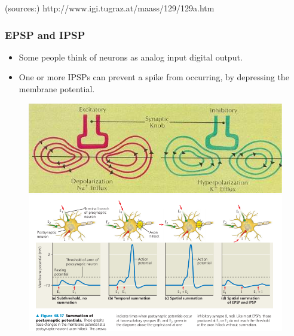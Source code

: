 \documentclass{beamer}
\begin{document}
\begin{frame}
\begin{itemize}
\begin{figure}
\begin{minipage}{.45\textwidth}
\end{minipage}
\vfill
\end{figure}

\end{itemize}
\vfill
\fontsize{6pt}{6pt}\selectfont 
(sources:)
http://www.igi.tugraz.at/maass/129/129a.htm

\end{frame}

\begin{frame}
\frametitle{EPSP and IPSP}
\begin{itemize}

\item \vfill Some people think of neurons as analog input digital output. %
\vfill

\item \vfill One or more IPSPs can prevent a spike from occurring, by depressing the membrane potential.

\end{itemize}

\begin{figure}
\begin{minipage}{0.45\linewidth}
\centering
\includegraphics[scale=0.32]{epsp1a.jpg} 
\end{minipage}

\begin{minipage}{0.45\linewidth}
\includegraphics[scale=0.32,center]{IPSPepsp.png}


\end{minipage}
\end{figure}
\end{frame}
\end{document}
